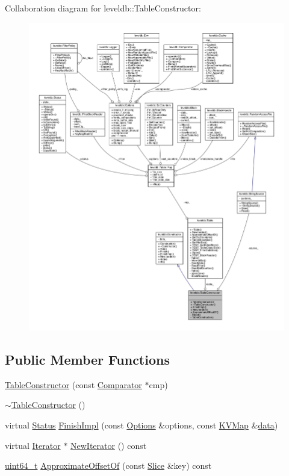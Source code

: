 Collaboration diagram for leveldb\+:\+:Table\+Constructor\+:
\nopagebreak
\begin{figure}[H]
\begin{center}
\leavevmode
\includegraphics[width=350pt]{classleveldb_1_1_table_constructor__coll__graph}
\end{center}
\end{figure}
\subsection*{Public Member Functions}
\begin{DoxyCompactItemize}
\item 
\hyperlink{classleveldb_1_1_table_constructor_acfc791dc15a8fac77f9715fda659eb19}{Table\+Constructor} (const \hyperlink{structleveldb_1_1_comparator}{Comparator} $\ast$cmp)
\item 
\hyperlink{classleveldb_1_1_table_constructor_a4be60433281b7d5e6aa37688be8d1631}{$\sim$\+Table\+Constructor} ()
\item 
virtual \hyperlink{classleveldb_1_1_status}{Status} \hyperlink{classleveldb_1_1_table_constructor_aa8ce3799a55859c2dee50d3e08f56ef2}{Finish\+Impl} (const \hyperlink{structleveldb_1_1_options}{Options} \&options, const \hyperlink{namespaceleveldb_aac1e50450147be263e08252c6700f7a7}{K\+V\+Map} \&\hyperlink{classleveldb_1_1_constructor_a55a0363200d6e86d8beb3b15b75e3824}{data})
\item 
virtual \hyperlink{classleveldb_1_1_iterator}{Iterator} $\ast$ \hyperlink{classleveldb_1_1_table_constructor_a4897f3cb58fed2bd3a9f7f6468b6a105}{New\+Iterator} () const 
\item 
\hyperlink{stdint_8h_aaa5d1cd013383c889537491c3cfd9aad}{uint64\+\_\+t} \hyperlink{classleveldb_1_1_table_constructor_a798ee199e8fdc5ec020725dba32a4cb6}{Approximate\+Offset\+Of} (const \hyperlink{classleveldb_1_1_slice}{Slice} \&key) const 
\end{DoxyCompactItemize}
